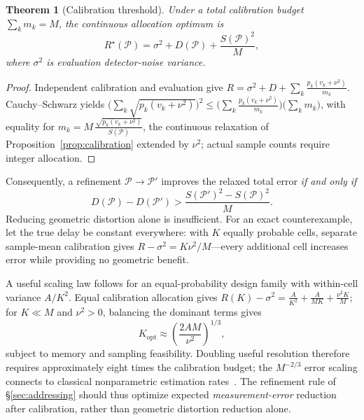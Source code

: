 \documentclass[11pt]{article}
\newtheorem{theorem}{Theorem}
\begin{document}
\begin{theorem}[Calibration threshold]\label{thm:threshold}
Under a total calibration budget $\sum_k m_k = M$, the continuous allocation optimum is
\begin{equation}
\boxed{
R^\star(\mathcal{P}) = \sigma^2 + D(\mathcal{P}) + \frac{S(\mathcal{P})^2}{M},
}
\end{equation}
where $\sigma^2$ is evaluation detector-noise variance.
\end{theorem}
\begin{proof}
Independent calibration and evaluation give
$R = \sigma^2 + D + \sum_k \frac{p_k(v_k+\nu^2)}{m_k}$. Cauchy--Schwarz yields
$\bigl(\sum_k \sqrt{p_k(v_k+\nu^2)}\bigr)^2 \le
\bigl(\sum_k \frac{p_k(v_k+\nu^2)}{m_k}\bigr)\bigl(\sum_k m_k\bigr)$, with equality for
$m_k = M\,\frac{\sqrt{p_k(v_k+\nu^2)}}{S(\mathcal{P})}$, the continuous relaxation of
Proposition~\ref{prop:calibration} extended by $\nu^2$; actual sample counts require
integer allocation.
\end{proof}

Consequently, a refinement $\mathcal{P} \to \mathcal{P}'$ improves the relaxed total
error \emph{if and only if}
\begin{equation}
\boxed{
D(\mathcal{P}) - D(\mathcal{P}') > \frac{S(\mathcal{P}')^2 - S(\mathcal{P})^2}{M}.
}
\end{equation}
Reducing geometric distortion alone is insufficient. For an exact counterexample, let
the true delay be constant everywhere: with $K$ equally probable cells, separate
sample-mean calibration gives $R - \sigma^2 = K\nu^2/M$---every additional cell increases
error while providing no geometric benefit.

A useful scaling law follows for an equal-probability design family with within-cell
variance $A/K^2$. Equal calibration allocation gives
$R(K) - \sigma^2 = \frac{A}{K^2} + \frac{A}{MK} + \frac{\nu^2 K}{M}$; for $K \ll M$ and
$\nu^2 > 0$, balancing the dominant terms gives
\begin{equation}
\boxed{
K_{\mathrm{opt}} \approx \left(\frac{2AM}{\nu^2}\right)^{1/3},
}
\end{equation}
subject to memory and sampling feasibility. Doubling useful resolution therefore
requires approximately eight times the calibration budget; the $M^{-2/3}$ error scaling
connects to classical nonparametric estimation rates~\cite{stone1982}. The refinement
rule of \S\ref{sec:addressing} should thus optimize expected \emph{measurement-error}
reduction after calibration, rather than geometric distortion reduction alone.
\end{document}
